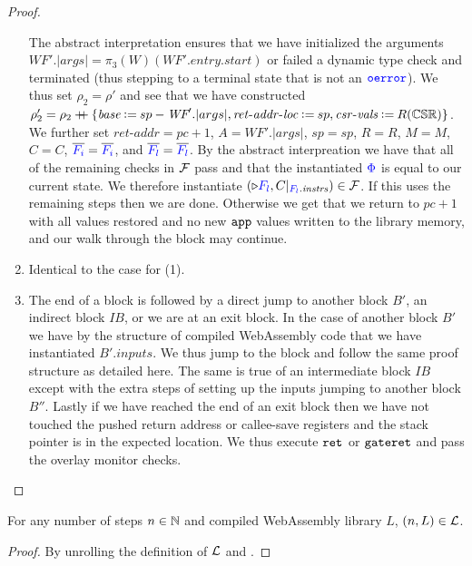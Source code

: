 \begin{proof}
\begin{enumerate}
    The abstract interpretation ensures that we have initialized the arguments
    $\textit{WF}'.|args| = \pi_3(W)(\textit{WF}'.\mathit{entry}.\mathit{start})$ or
    failed a dynamic type check and terminated (thus stepping to a terminal state
    that is not an ${\color{blue}{\mathtt{oerror}}}$).
    We thus set $\rho_2 = \rho'$ and see that we have constructed $\rho_2' =
    \rho_2 \mathbin{{+}\mspace{-8mu}{+}} \{ \mathit{base} \mathbin{\vcentcolon=} sp - \textit{WF}'.|args|,
    \mathit{ret\mbox{-}addr\mbox{-}loc} \mathbin{\vcentcolon=} sp, \mathit{csr\mbox{-}vals} \mathbin{\vcentcolon=}
    R(\mathbb{CSR}) \}$.
    We further set $\mathit{ret\mbox{-}addr} = pc + 1$, $A = \textit{WF}'.|args|$,
    $sp = sp$, $R = R$, $M = M$, $C = C$, $\overline{{\color{blue}{F_i}}} = \overline{{\color{blue}{F_i}}}$,
    and $\overline{{\color{blue}{F_l}}} = \overline{{\color{blue}{F_l}}}$.
    By the abstract interpreation we have that all of the remaining checks in
    $\mathcal{F}$ pass and that the instantiated ${\color{blue}{\Phi}}$ is equal to our current
    state.
    We therefore instantiate $(\mathord{\triangleright} {\color{blue}{F_l}}, C|_{{\color{blue}{F_l}}.\mathit{instrs}}) \in \mathcal{F}$.
    If this uses the remaining steps then we are done.
    Otherwise we get that we return to $pc + 1$ with all values restored and no
    new $\mathtt{app}$ values written to the library memory, and our walk through the
    block may continue.

  \item

    Identical to the case for (1).

  \item

    The end of a block is followed by a direct jump to another block $B'$, an
    indirect block $\mathit{IB}$, or we are at an exit block.
    In the case of another block $B'$ we have by the structure of compiled
    WebAssembly code that we have instantiated $B'.inputs$.
    We thus jump to the block and follow the same proof structure as detailed here.
    The same is true of an intermediate block $\mathit{IB}$ except with the
    extra steps of setting up the inputs jumping to another block $B''$.
    Lastly if we have reached the end of an exit block then we have not touched
    the pushed return address or callee-save registers and the stack pointer is in
    the expected location.
    We thus execute $\mathtt{ret}_{{}}$ or $\mathtt{gateret}$ and pass the overlay monitor checks.
  \end{enumerate}
\end{proof}

\begin{lemma} \label{thm:appendix:wasm:lr:ftlr-libraries}
  For any number of steps $n \in \mathbb{N}$ and compiled WebAssembly library $L$,
  $(n, L) \in \mathcal{L}$.
\end{lemma}
\begin{proof}
  By unrolling the definition of $\mathcal{L}$ and .
\end{proof}

